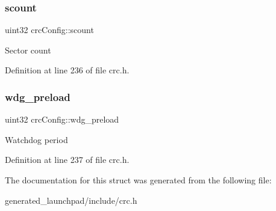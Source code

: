 \subsubsection{\texorpdfstring{scount}{scount}}
{\footnotesize\ttfamily uint32 crc\+Config\+::scount}

Sector count 

Definition at line 236 of file crc.\+h.

\mbox{\label{structcrcConfig_aec5b9938f600e872530c77b6746df64d}} 
\subsubsection{\texorpdfstring{wdg\+\_\+preload}{wdg\_preload}}
{\footnotesize\ttfamily uint32 crc\+Config\+::wdg\+\_\+preload}

Watchdog period 

Definition at line 237 of file crc.\+h.



The documentation for this struct was generated from the following file\+:\begin{DoxyCompactItemize}
\item 
generated\+\_\+launchpad/include/crc.\+h\end{DoxyCompactItemize}
